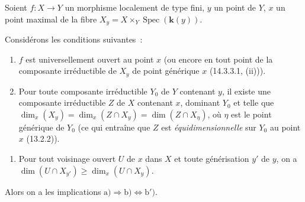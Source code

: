 \begin{proposition}[14.3.13]
\label{IV.14.3.13-fr}
Soient $f:X\to Y$ un morphisme localement de type fini, $y$ un point de $Y$, $x$
un point maximal de la fibre $X_y=X\times_Y\operatorname{Spec}(\boldsymbol{k}(y))$.

Considérons les conditions suivantes~:
\begin{enumerate}[label=\emph{\alph*)}]
  \item $f$ est universellement ouvert au point $x$ \textup{(ou encore en tout point de la
  composante irréductible de $X_y$ de point générique $x$ (14.3.3.1, (ii)))}.
  \item Pour toute composante irréductible $Y_0$ de $Y$ contenant $y$, il existe
  une composante irréductible $Z$ de $X$ contenant $x$, dominant $Y_0$ et telle que
  $\dim_x(X_y)=\dim_x(Z\cap X_y)=\dim(Z\cap X_\eta)$, où $\eta$ est le point
  générique de $Y_0$ \textup{(ce qui entraîne que $Z$ est \emph{équidimensionnelle} sur $Y_0$ au
  point $x$ (13.2.2))}.
\end{enumerate}


\begin{enumerate}[label=\emph{\alph*$'$)}]
  \item[\textup{b$'$)}] Pour tout voisinage ouvert $U$ de $x$ dans $X$ et toute
  générisation $y'$ de $y$, on a
  $\dim(U\cap X_{y'})\geq\dim_x(U\cap X_y)$.
\end{enumerate}

Alors on a les implications $\mathrm{a})\Rightarrow\mathrm{b})\Leftrightarrow\mathrm{b}')$.
\end{proposition}

